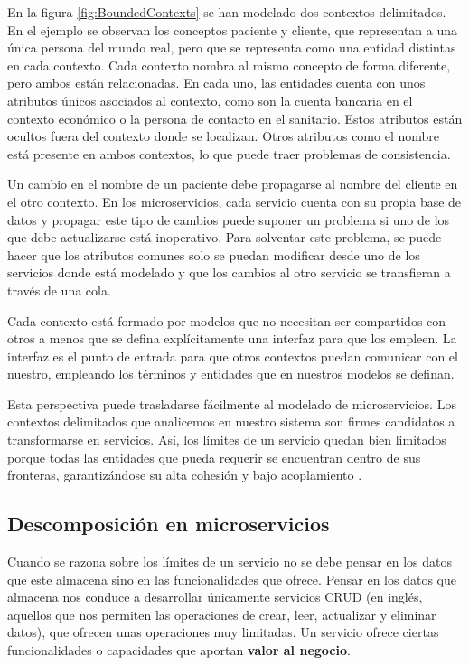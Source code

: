 \documentclass[11pt,spanish,listoffigures]{tfgetsinf}
\begin{document}
En la figura \ref{fig:BoundedContexts} se han modelado dos contextos delimitados. En el ejemplo se observan los conceptos paciente y cliente, que representan a una única persona del mundo real, pero que se representa como una entidad distintas en cada contexto. Cada contexto nombra al mismo concepto de forma diferente, pero ambos están relacionadas. En cada uno, las entidades cuenta con unos atributos únicos asociados al contexto, como son la cuenta bancaria en el contexto económico o la persona de contacto en el sanitario. Estos atributos están ocultos fuera del contexto donde se localizan. Otros atributos como el nombre está presente en ambos contextos, lo que puede traer problemas de consistencia. 

Un cambio en el nombre de un paciente debe propagarse al nombre del cliente en el otro contexto. En los microservicios, cada servicio cuenta con su propia base de datos y propagar este tipo de cambios puede suponer un problema si uno de los que debe actualizarse está inoperativo. Para solventar este problema, se puede hacer que los atributos comunes solo se puedan modificar desde uno de los servicios donde está modelado y que los cambios al otro servicio se transfieran a través de una cola. 

Cada contexto está formado por modelos que no necesitan ser compartidos con otros a menos que se defina explícitamente una interfaz para que los empleen. La interfaz es el punto de entrada para que otros contextos puedan comunicar con el nuestro, empleando los términos y entidades que en nuestros modelos se definan.

Esta perspectiva puede trasladarse fácilmente al modelado de microservicios. Los contextos delimitados que analicemos en nuestro sistema son firmes candidatos a transformarse en servicios. Así, los límites de un servicio quedan bien limitados porque  todas las entidades que pueda requerir se encuentran dentro de sus fronteras, garantizándose su alta cohesión y bajo acoplamiento \cite{Newman2015a}.

\subsection{Descomposición en microservicios} \label{subsect:Descomposicion}

Cuando se razona sobre los límites de un servicio no se debe pensar en los datos que este almacena sino en las funcionalidades que ofrece. Pensar en los datos que almacena nos conduce a desarrollar únicamente servicios CRUD (en inglés, aquellos que nos permiten las operaciones de crear, leer, actualizar y eliminar datos), que ofrecen unas operaciones muy limitadas. Un servicio ofrece ciertas funcionalidades o capacidades que aportan \textbf{valor al negocio}.
\end{document}
